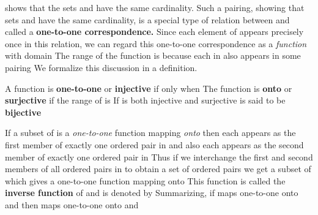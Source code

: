 \documentclass[11pt,oneside]{article}
\begin{document}
\begin{BookBody}
\noindent shows that the sets  and  have the same cardinality. Such a pairing, showing that sets  and  have the same cardinality, is a special type of relation \BookInline{\leftrightarrow } between  and  called a\textbf{ one-to-one correspondence.} Since each element  of  appears precisely once in this relation, we can regard this one-to-one correspondence as a\textit{ function} with domain  The range of the function is  because each  in  also appears in some pairing  We formalize this discussion in a definition.

 \label{bookfootnote:21:1:ref}A function  is\textbf{ one-to-one} or\textbf{ injective} if  only when  The function \BookInline{\phi } is\textbf{ onto} or\textbf{ surjective} if the range of \BookInline{\phi } is  If \BookInline{\phi } is both injective and surjective\BookInline{,\allowbreak \phi } is said to be\textbf{ bijective}\BookEnd{\blacksquare}

If a subset of  is a\textit{ one-to-one} function \BookInline{\phi } mapping  \textit{onto}  then each  appears as the first member of exactly one ordered pair in \BookInline{\phi } and also each  appears as the second member of exactly one ordered pair in  Thus if we interchange the first and second members of all ordered pairs  in \BookInline{\phi } to obtain a set of ordered pairs  we get a subset of  which gives a one-to-one function mapping  onto  This function is called the\textbf{ inverse function} of \BookInline{\phi,\allowbreak } and is denoted by  Summarizing, if \BookInline{\phi } maps  one-to-one onto  and  then  maps  one-to-one onto  and 


\end{BookBody}
\end{document}
